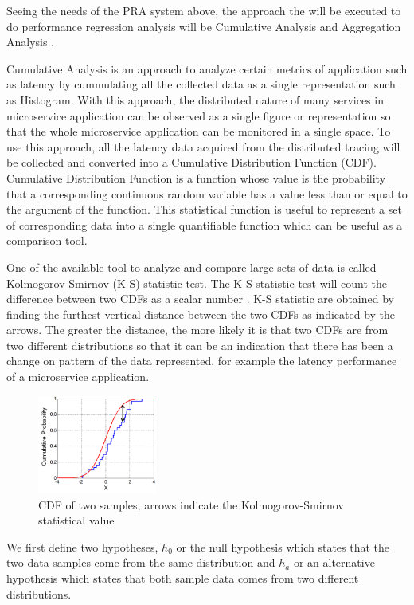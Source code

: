 \documentclass[conference]{configs/IEEEtran}
\begin{document}
Seeing the needs of the PRA system above, the approach the will be executed to do performance regression analysis will be Cumulative Analysis and Aggregation Analysis \cite{parker2020distributed}. 

Cumulative Analysis is an approach to analyze certain metrics of application such as latency by cummulating all the collected data as a single representation such as Histogram. With this approach, the distributed nature of many services in microservice application can be observed as a single figure or representation so that the whole microservice application can be monitored in a single space. To use this approach, all the latency data acquired from the distributed tracing will be collected and converted into a Cumulative Distribution Function (CDF). Cumulative Distribution Function is a function whose value is the probability that a corresponding continuous random variable has a value less than or equal to the argument of the function. This statistical function is useful to represent a set of corresponding data into a single quantifiable function which can be useful as a comparison tool. 

One of the available tool to analyze and compare large sets of data is called Kolmogorov-Smirnov (K-S) statistic test. The K-S statistic test will count the difference between two CDFs as a scalar number \cite{kolmogorov_1951}. K-S statistic are obtained by finding the furthest vertical distance between the two CDFs as indicated by the arrows. The greater the distance, the more likely it is that two CDFs are from two different distributions so that it can be an indication that there has been a change on pattern of the data represented, for example the latency performance of a microservice application.
\begin{figure}[htb]
	\centering
	\includegraphics[width=0.35\textwidth]{resources/ch2/ks.png}
	\caption{CDF of two samples, arrows indicate the Kolmogorov-Smirnov statistical value \cite{wiki:ks-test}}
	\label{ks-example}
\end{figure}

We first define two hypotheses, $h_{0}$ or the null hypothesis which states that the two data samples come from the same distribution and $h_{a}$ or an alternative hypothesis which states that both sample data comes from two different distributions.
\end{document}
